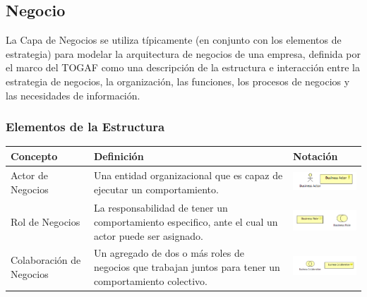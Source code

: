 \subsection{Negocio}

La Capa de Negocios se utiliza típicamente (en conjunto con los elementos de estrategia) para modelar la arquitectura de negocios de una empresa, definida por el marco del TOGAF como una descripción de la estructura e interacción entre la estrategia de negocios, la organización, las funciones, los procesos de negocios y las necesidades de información.

\subsubsection{Elementos de la Estructura}
\begin{table}[H]
	\centering
	\begin{tabular}{| m{3cm} | m{7cm} | m{3.8cm} |}
		\hline
		\textbf{Concepto}           & \textbf{Definición} & \textbf{Notación} \\ \hline
		
		Actor de Negocios        & Una entidad organizacional que es capaz de ejecutar un comportamiento.                                                                                                              &\vspace{1.52mm}\includegraphics[width=40mm, height=10mm]{imgs/conceptos/negocio/Business_actor.pdf}    \\ \hline
		
		Rol de Negocios          & La responsabilidad de tener un comportamiento especifico, ante el cual un actor puede ser asignado.                                                                                 &\vspace{1.52mm}\includegraphics[width=40mm, height=10mm ]{imgs/conceptos/negocio/Business_role.pdf}         \\ \hline
		
		Colaboración de Negocios & Un agregado de dos o más roles de negocios que trabajan juntos para tener un comportamiento colectivo.                                                                             
		&\vspace{1.52mm} \includegraphics[width=40mm,height=10mm]{imgs/conceptos/negocio/Business_colaboration.pdf}             \\ \hline
		

\end{tabular}
\end{table}
